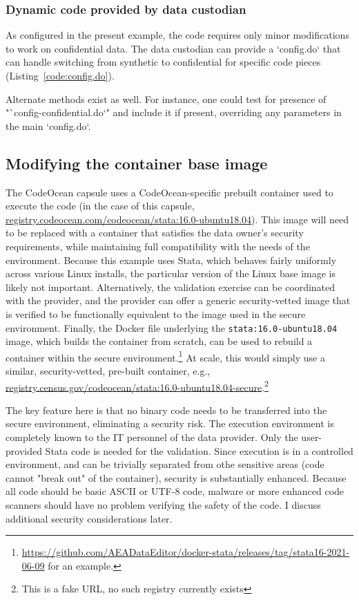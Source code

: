 \documentclass[]{hdsr}
\begin{document}
\subsubsection{Dynamic code provided by data custodian}

As configured in the present example, the code requires only minor modifications to work on confidential data. The data custodian can provide a `config.do`  that can handle switching from synthetic to confidential for specific code pieces (Listing~\ref{code:config.do}).



Alternate methods exist as well. For instance, one could test for presence of "`config-confidential.do`" and include it if present, overriding any parameters in the main `config.do`.

\subsection{Modifying the container base image}

The CodeOcean capsule uses a CodeOcean-specific prebuilt container used to execute the code (in the case of this capsule, \url{registry.codeocean.com/codeocean/stata:16.0-ubuntu18.04}). This image will need to be replaced with a container that satisfies the data owner's security requirements, while maintaining full compatibility with the needs of the environment. Because this example uses Stata, which behaves fairly uniformly across various Linux installs, the particular version of the Linux base image is likely not important.   Alternatively, the validation exercise can be coordinated with the provider, and the provider can offer a generic security-vetted image that is verified to be functionally equivalent to the image used in the secure environment. Finally, the Docker file underlying the \texttt{stata:16.0-ubuntu18.04} image, which builds the container from scratch, can be used to rebuild a container within the secure environment.\footnote{\href{github.com/AEADataEditor/docker-stata/releases/tag/stata16-2021-06-09}{https://github.com/AEADataEditor/docker-stata/releases/tag/stata16-2021-06-09} for an example.} At scale, this would simply use a similar, security-vetted, pre-built container, e.g., \url{registry.census.gov/codeocean/stata:16.0-ubuntu18.04-secure}.\footnote{This is a fake URL, no such registry currently exists}

The key feature here is that no binary code needs to be transferred into the secure environment, eliminating a security risk. The execution environment is completely known to the IT personnel of the data provider. Only the user-provided Stata code is needed for the validation. Since execution is in a controlled environment, and can be trivially separated from othe sensitive areas (code cannot "break out" of the container), security is substantially enhanced. Because all code should be basic ASCII or UTF-8 code, malware or more enhanced code scanners should have no problem verifying the safety of the code. I discuss additional security considerations later.
\end{document}
